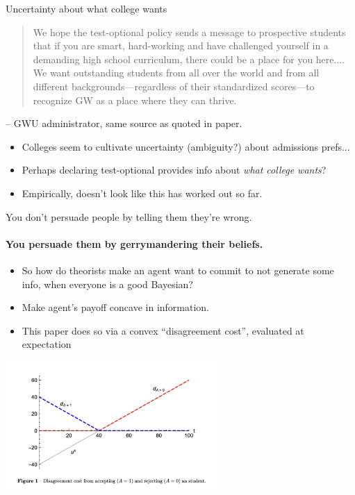 \documentclass[11pt, aspectratio=169]{beamer}
\theoremstyle{plain}
\theoremstyle{plain}
\theoremstyle{plain}
\theoremstyle{plain}
\begin{document}
\begin{frame}{Uncertainty about what college wants}
    \begin{quotation}
        We hope the test-optional policy sends a message to prospective students that if you are smart, hard-working and have challenged yourself in a demanding high school curriculum, there could be a place for you here....
        We want outstanding students from all over the world and from all different backgrounds—regardless of their standardized scores—to recognize GW as a place where they can thrive.
    \end{quotation} -- GWU administrator, same source as quoted in paper.  \\ \pause

    \begin{itemize}
        \item Colleges seem to cultivate uncertainty (ambiguity?) about admissions prefs... \pause
        \item Perhaps declaring test-optional provides info about \emph{what college wants}? \pause
        \item Empirically, doesn't look like this has worked out so far. 
    \end{itemize}

\end{frame}


\begin{frame}{You don't persuade people by telling them they're wrong.}\framesubtitle{You persuade them by gerrymandering their beliefs.}
\begin{itemize}
    \pause 
    \item So how do theorists make an agent want to commit to not generate some info, when everyone is a good Bayesian? \pause
    \item  Make agent's payoff concave in information. \pause
    \item This paper does so via a convex ``disagreement cost'', evaluated at expectation \pause
\end{itemize}
\begin{center} \includegraphics[width=0.6\textwidth]{testoptional-fig1.png} \end{center}
\end{frame}
\end{document}
